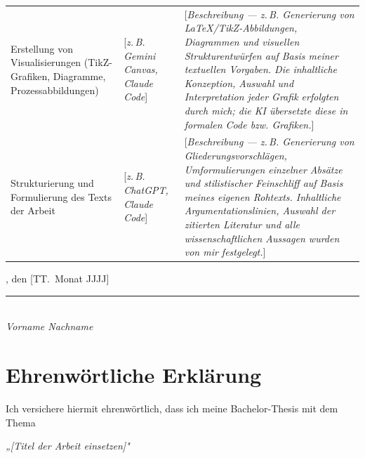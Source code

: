 \documentclass[11pt,a4paper,oneside]{book}
\begin{document}
\begin{longtable}{@{}p{3.5cm}p{3.0cm}p{6.1cm}@{}}
Erstellung von Visualisierungen (TikZ-Grafiken, Diagramme, Prozessabbildungen)
& [\textit{z.\,B. Gemini Canvas, Claude Code}] %
& [\textit{Beschreibung — z.\,B. Generierung von \LaTeX{}/TikZ-Abbildungen, Diagrammen und visuellen Strukturentwürfen auf Basis meiner textuellen Vorgaben. Die inhaltliche Konzeption, Auswahl und Interpretation jeder Grafik erfolgten durch mich; die KI übersetzte diese in formalen Code bzw. Grafiken.}] \\[0.3cm] %

Strukturierung und Formulierung des Texts der Arbeit
& [\textit{z.\,B. ChatGPT, Claude Code}] %
& [\textit{Beschreibung — z.\,B. Generierung von Gliederungsvorschlägen, Umformulierungen einzelner Absätze und stilistischer Feinschliff auf Basis meines eigenen Rohtexts. Inhaltliche Argumentationslinien, Auswahl der zitierten Literatur und alle wissenschaftlichen Aussagen wurden von mir festgelegt.}] \\ %

\bottomrule
\end{longtable}

\vspace{0.5cm}

\noindent
[Ort], den [TT.\ Monat JJJJ]                                      %

\vspace{1.0cm}

\noindent
\rule{5cm}{0.4pt}\\
\textit{Vorname Nachname}                                        %

\clearpage


\chapter*{Ehrenwörtliche Erklärung}
\thispagestyle{empty}

Ich versichere hiermit ehrenwörtlich, dass ich meine Bachelor-Thesis mit dem Thema

\begin{center}
\textit{„[Titel der Arbeit einsetzen]"}                          %
\end{center}
\end{document}
